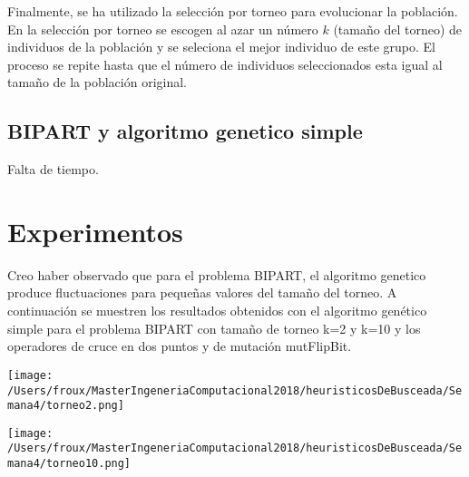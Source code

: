 \documentclass{article}
\begin{document}
 Finalmente, se ha utilizado la selección por torneo para evolucionar la población. En la selección por torneo se escogen al azar un número $k$ (tamaño del torneo) de individuos de la población y se seleciona el mejor individuo de este grupo. El proceso se repite hasta que el número de individuos seleccionados esta igual al tamaño de la población original.
  
 \subsection{BIPART y algoritmo genetico simple}
 Falta de tiempo.
 
  \section{Experimentos}
Creo haber observado que para el problema BIPART, el algoritmo genetico produce fluctuaciones para pequeñas valores del tamaño del torneo. A continuación se muestren los resultados obtenidos con el algoritmo genético simple para el problema BIPART con tamaño de torneo k=2 y k=10 y los operadores de cruce en dos puntos y de mutación mutFlipBit.

  \begin{center} 
 \texttt{[image: /Users/froux/MasterIngeneriaComputacional2018/heuristicosDeBusceada/Semana4/torneo2.png]}
 \end{center}


  \begin{center} 
 \texttt{[image: /Users/froux/MasterIngeneriaComputacional2018/heuristicosDeBusceada/Semana4/torneo10.png]}
 \end{center}
 
\end{document}
